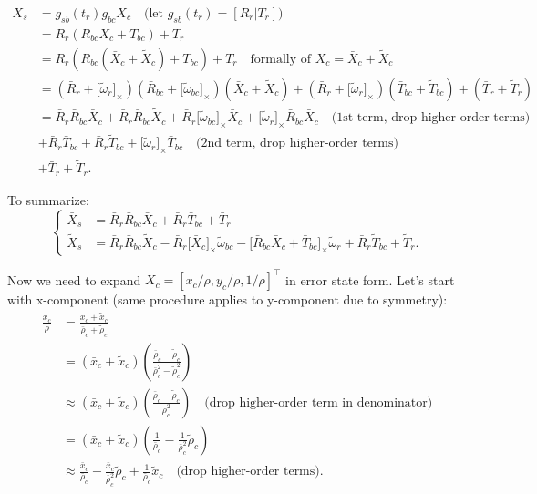 \documentclass[letter,10pt]{article}
\newcommand{\asym}[1]{{\lbrack #1\rbrack}_\times{}}
\begin{document}
\begin{equation}
\begin{aligned}
X_s &= g_{sb}(t_r) g_{bc} X_c \quad\text{(let } g_{sb}(t_r)=[R_r|T_r] \text{)}\\
&= R_r(R_{bc} X_c + T_{bc}) + T_r \\ 
&= R_r(R_{bc} (\bar X_c + \tilde X_c)
+ T_{bc}) + T_r \quad\text{formally of } X_c = \bar X_c + \tilde X_c\\
&= (\bar R_r + \asym{\tilde \omega_r})(\bar R_{bc} + \asym{\tilde \omega_{bc}})(\bar X_c + \tilde X_c) + (\bar R_r + \asym{\tilde \omega_r})(\bar T_{bc} + \tilde T_{bc}) + (\bar T_r + \tilde T_r) \\
&= \bar R_r \bar R_{bc} \bar X_c  + 
\bar R_r \bar R_{bc} \tilde X_c +
\bar R_r \asym{\tilde\omega_{bc}} \bar X_c +
\asym{\tilde \omega_r} \bar R_{bc} \bar X_c \quad\text{(1st term, drop higher-order terms)}\\
&+ \bar R_r \bar T_{bc} + \bar R_r \tilde T_{bc} + \asym{\tilde\omega_r} \bar T_{bc} \quad\text{(2nd term, drop higher-order terms)}\\
&+ \bar T_r + \tilde T_r.
\end{aligned}
\end{equation}

To summarize:
\begin{equation}
\begin{cases}
\bar X_s &= \bar R_r \bar R_{bc} \bar X_c + \bar R_r \bar T_{bc} + \bar T_r\\
\tilde X_s &= \bar R_r \bar R_{bc} \tilde X_c - \bar R_r \asym{\bar X_c} \tilde \omega_{bc} - \asym{\bar R_{bc}\bar X_c + \bar T_{bc}} \tilde \omega_r + \bar R_r \tilde T_{bc} + \tilde T_r.
\end{cases}
\end{equation}

Now we need to expand $X_c = [x_c/\rho, y_c/\rho, 1/\rho]^\top$ in error state form. Let's start with x-component (same procedure applies to y-component due to symmetry):
\begin{equation}
\begin{aligned}
\frac{x_c}{\rho}
&= \frac{\bar x_c + \tilde x_c}{\bar \rho_c + \tilde \rho_c} \\
&= (\bar x_c + \tilde x_c) \left (  \frac{\bar \rho_c - \tilde \rho_c}{\bar \rho_c^2 - \tilde \rho_c^2}  \right ) \\
&\approx (\bar x_c + \tilde x_c) \left (  \frac{\bar \rho_c - \tilde \rho_c}{\bar \rho_c^2}  \right ) \quad\text{(drop higher-order term in denominator)}\\
&= (\bar x_c + \tilde x_c)\left (\frac{1}{\bar \rho_c} - \frac{1}{\bar \rho_c^2}\tilde \rho_c \right )\\
&\approx \frac{\bar x_c}{\bar\rho_c} - \frac{\bar x_c}{\bar \rho_c^2} \tilde\rho_c + \frac{1}{\bar \rho_c} \tilde x_c \quad\text{(drop higher-order terms)}.
\end{aligned}
\end{equation}
\end{document}
